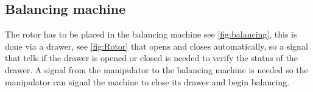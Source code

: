  
 \subsection{Balancing machine}
 The rotor has to be placed in the balancing machine see \ref{fig:balancing}, this is done via a drawer, see \ref{fig:Rotor} that opens and closes automatically, so a signal that tells if the drawer is opened or closed is needed to verify the status of the drawer. A signal from the manipulator to the balancing machine is needed so the manipulator can signal the machine to close its drawer and begin balancing.\\
 

